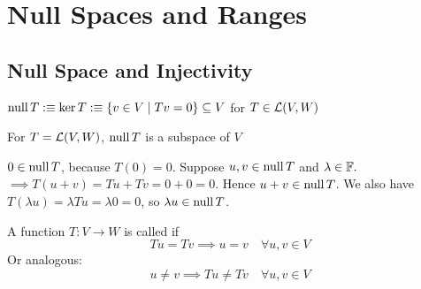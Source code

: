 \section{Null Spaces and Ranges}

\subsection{Null Space and Injectivity}

\begin{mydef} 
  $\operatorname{null} T :\equiv \ker T :\equiv \{ v \in V \mid Tv=0\} \subseteq V$ for $T \in {\mathcal{L}(V,W)}$
\end{mydef}

\setcounter{thm}{12}
\begin{thm} 
  \label{thm: null space is a subspace}
  For $T=\mathcal{L}(V, W)$, $\operatorname{null} T$ is a subspace of $V$
\end{thm}
\begin{prf}
  $0 \in \operatorname{null} T$, because $T(0) = 0$. Suppose $u,v \in \operatorname{null} T$ and $\lambda \in \mathbb{F}.$ $\implies T(u+v)=Tu+Tv=0+0=0.$ Hence $u+v \in \operatorname{null} T$. We also have $T(\lambda u)= \lambda Tu = \lambda 0 = 0$, so $\lambda u \in \operatorname{null} T$.
\end{prf}

\setcounter{thm}{13}
\begin{mydef} [injectivity]
  \label{def: injectivity}
  A function $T: V \to W$ is called  if
  \begin{equation}
    Tu = Tv \implies u = v \quad \forall u,v \in V
  \end{equation}
  Or analogous:
  \begin{equation}
    u \neq v \implies Tu \neq Tv \quad \forall u,v \in V
  \end{equation}
\end{mydef}

